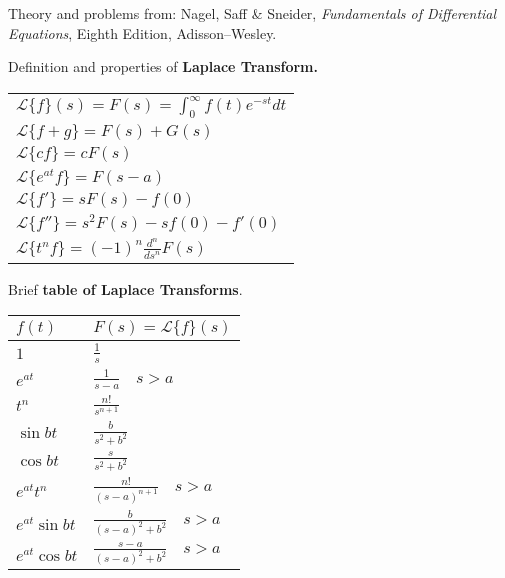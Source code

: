 \documentclass[11pt]{article}
\begin{document}



\LabSolutions


Theory and problems from: Nagel, Saff \& Sneider, \textit{Fundamentals of Differential Equations}, Eighth Edition, Adisson--Wesley.

\begin{preamble}
 
\begin{formulaitem}
\item Definition and properties of \textbf{Laplace Transform. }
\renewcommand{\arraystretch}{1.5}
\setlength{\tabcolsep}{10pt}
\begin{center}
\begin{tabular}{|l|}
\hline
$\mathcal{L}\{f\}(s)=F(s)=\int_{0}^{\infty}f(t)e^{-st}dt$\\
$\mathcal{L}\{f+g\}=F(s)+G(s)$ \\
$\mathcal{L}\{cf\}=cF(s)$ \\
$\mathcal{L}\{e^{at}f\}=F(s-a)$ \\
$\mathcal{L}\{f'\}=sF(s)-f(0)$ \\
$\mathcal{L}\{f''\}=s^{2}F(s)-sf(0)-f'(0)$ \\
$\mathcal{L}\{t^{n}f\}=(-1)^{n}\frac{d^{n}}{ds^{n}}F(s)$ \\ 
\hline
\end{tabular}
\end{center}

\item Brief \textbf{table of Laplace Transforms}.
\renewcommand{\arraystretch}{1.5}
\setlength{\tabcolsep}{10pt}
\begin{center}
\begin{tabular}{|ll|}
\hline
$f(t)$ & $F(s)=\mathcal{L}\{f\}(s)$ \\
\hline
$1$ & $\frac{1}{s}$ \\
$e^{at}$ & $\frac{1}{s-a} \quad s>a$\\
$t^{n}$ & $\frac{n!}{s^{n+1}}$ \\
$\sin bt$ & $\frac{b}{s^{2}+b^{2}}$ \\
$\cos bt$ & $\frac{s}{s^{2}+b^{2}}$ \\
$e^{at}t^{n}$ & $\frac{n!}{(s-a)^{n+1}} \quad s>a$ \\
$e^{at}\sin bt$ & $\frac{b}{(s-a)^{2}+b^{2}} \quad s>a$ \\
$e^{at}\cos bt$ & $\frac{s-a}{(s-a)^{2}+b^{2}} \quad s>a$ \\
\hline 
\end{tabular}
\end{center}


\end{formulaitem}
\end{preamble}
\end{document}
